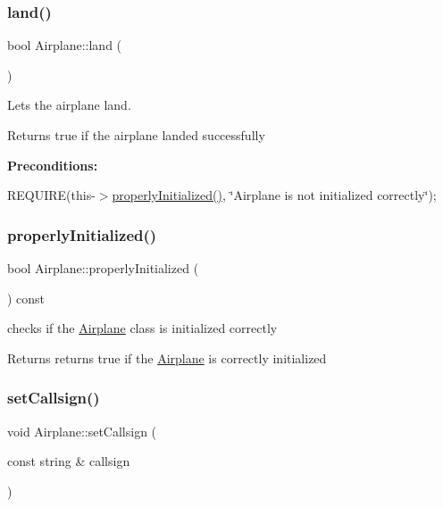 \subsubsection{\texorpdfstring{land()}{land()}}
{\footnotesize\ttfamily bool Airplane\+::land (\begin{DoxyParamCaption}{ }\end{DoxyParamCaption})}



Lets the airplane land. 

\begin{DoxyReturn}{Returns}
true if the airplane landed successfully
\end{DoxyReturn}
{\bfseries Preconditions\+:}
\begin{DoxyItemize}
\item R\+E\+Q\+U\+I\+RE(this-\/$>$\mbox{\hyperlink{class_airplane_a6f80df8f692cc8d67d292c1e9f26d59e}{properly\+Initialized()}}, \char`\"{}\+Airplane is not initialized correctly\char`\"{}); 
\end{DoxyItemize}\mbox{\label{class_airplane_a6f80df8f692cc8d67d292c1e9f26d59e}} 
\subsubsection{\texorpdfstring{properly\+Initialized()}{properlyInitialized()}}
{\footnotesize\ttfamily bool Airplane\+::properly\+Initialized (\begin{DoxyParamCaption}{ }\end{DoxyParamCaption}) const}



checks if the \mbox{\hyperlink{class_airplane}{Airplane}} class is initialized correctly 

\begin{DoxyReturn}{Returns}
returns true if the \mbox{\hyperlink{class_airplane}{Airplane}} is correctly initialized 
\end{DoxyReturn}
\mbox{\label{class_airplane_aed67dce16e3a4b1c1811e3344a039d90}} 
\subsubsection{\texorpdfstring{set\+Callsign()}{setCallsign()}}
{\footnotesize\ttfamily void Airplane\+::set\+Callsign (\begin{DoxyParamCaption}\item[{const string \&}]{callsign }\end{DoxyParamCaption})}



